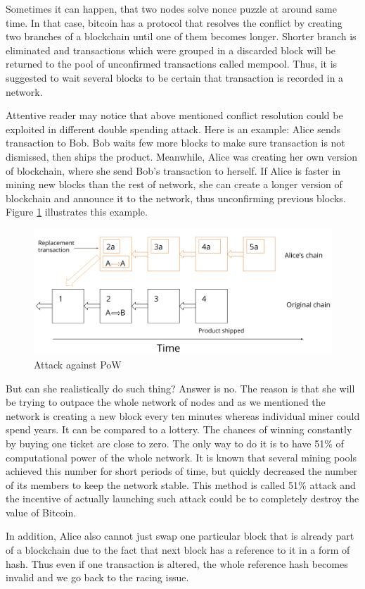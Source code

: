 \documentclass[conference,compsoc]{IEEEtran}
\begin{document}
Sometimes it can happen, that two nodes solve nonce puzzle at around same time. 
In that case, bitcoin has a protocol that resolves the conflict by creating two branches of a blockchain until one of them becomes longer.
Shorter branch is eliminated and transactions which were grouped in a discarded block will be returned to the pool of unconfirmed transactions called mempool.
Thus, it is suggested to wait several blocks to be certain that transaction is recorded in a network.

Attentive reader may notice that above mentioned conflict resolution could be exploited in different double spending attack. 
Here is an example: Alice sends transaction to Bob. 
Bob waits few more blocks to make sure transaction is not dismissed, then ships the product.
Meanwhile, Alice was creating her own version of blockchain, where she send Bob's transaction to herself. 
If Alice is faster in mining new blocks than the rest of network, she can create a longer version of blockchain and announce it to the network, thus unconfirming previous blocks.
Figure \ref{fig:fig4} illustrates this example.

\begin{figure}[h]
  \centering
  \includegraphics[width=.45\textwidth]{graphics/pow.png}
  \caption{Attack against PoW}
  \label{fig:fig4}
\end{figure}

But can she realistically do such thing? 
Answer is no.
The reason is that she will be trying to outpace the whole network of nodes and as we mentioned the network is creating a new block every ten minutes whereas individual miner could spend years. 
It can be compared to a lottery. 
The chances of winning constantly by buying one ticket are close to zero. 
The only way to do it is to have 51\% of computational power of the whole network.
It is known that several mining pools achieved this number for short periods of time, but quickly decreased the number of its members to keep the network stable.
This method is called 51\% attack and the incentive of actually launching such attack could be to completely destroy the value of Bitcoin. 

In addition, Alice also cannot just swap one particular block that is already part of a blockchain due to the fact that next block has a reference to it in a form of hash. 
Thus even if one transaction is altered, the whole reference hash becomes invalid and we go back to the racing issue.
\end{document}
